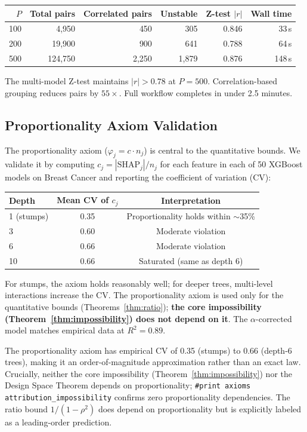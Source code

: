 \documentclass{article}
\begin{document}
\begin{center}
\small
\begin{tabular}{@{}rrrrrr@{}}
\toprule
$P$ & Total pairs & Correlated pairs & Unstable & Z-test $|r|$ & Wall time \\
\midrule
100 & 4,950 & 450 & 305 & 0.846 & 33\,s \\
200 & 19,900 & 900 & 641 & 0.788 & 64\,s \\
500 & 124,750 & 2,250 & 1,879 & 0.876 & 148\,s \\
\bottomrule
\end{tabular}
\end{center}

The multi-model Z-test maintains $|r| > 0.78$ at $P = 500$. Correlation-based grouping reduces pairs by $55\times$. Full workflow completes in under 2.5 minutes.

\subsection{Proportionality Axiom Validation}

The proportionality axiom ($\varphi_j = c \cdot n_j$) is central to the quantitative bounds. We validate it by computing $c_j = |\text{SHAP}_j| / n_j$ for each feature in each of 50 XGBoost models on Breast Cancer and reporting the coefficient of variation (CV):

\begin{center}
\small
\begin{tabular}{@{}lcc@{}}
\toprule
Depth & Mean CV of $c_j$ & Interpretation \\
\midrule
1 (stumps) & 0.35 & Proportionality holds within $\sim$35\% \\
3 & 0.60 & Moderate violation \\
6 & 0.66 & Moderate violation \\
10 & 0.66 & Saturated (same as depth 6) \\
\bottomrule
\end{tabular}
\end{center}

For stumps, the axiom holds reasonably well; for deeper trees, multi-level interactions increase the CV. The proportionality axiom is used only for the quantitative bounds (Theorems~\ref{thm:ratio}); \textbf{the core impossibility (Theorem~\ref{thm:impossibility}) does not depend on it}. The $\alpha$-corrected model matches empirical data at $R^2 = 0.89$.

The proportionality axiom has empirical CV of 0.35 (stumps) to 0.66 (depth-6 trees), making it an order-of-magnitude approximation rather than an exact law. Crucially, neither the core impossibility (Theorem~\ref{thm:impossibility}) nor the Design Space Theorem depends on proportionality; \texttt{\#print axioms attribution\_impossibility} confirms zero proportionality dependencies. The ratio bound $1/(1{-}\rho^2)$ does depend on proportionality but is explicitly labeled as a leading-order prediction.
\end{document}
